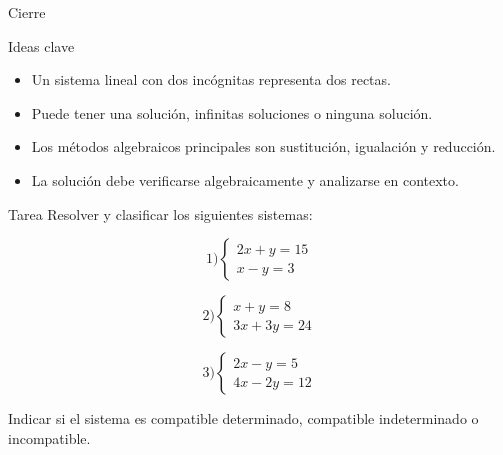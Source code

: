 \documentclass[aspectratio=169]{beamer}
\begin{document}
	\begin{frame}{Cierre}
		\begin{block}{Ideas clave}
			\begin{itemize}
				\item Un sistema lineal con dos incógnitas representa dos rectas.
				\item Puede tener una solución, infinitas soluciones o ninguna solución.
				\item Los métodos algebraicos principales son sustitución, igualación y reducción.
				\item La solución debe verificarse algebraicamente y analizarse en contexto.
			\end{itemize}
		\end{block}
	\end{frame}
	
	\begin{frame}{Tarea}
		Resolver y clasificar los siguientes sistemas:
		
		\[
		1)
		\begin{cases}
			2x+y=15\\
			x-y=3
		\end{cases}
		\]
		
		\[
		2)
		\begin{cases}
			x+y=8\\
			3x+3y=24
		\end{cases}
		\]
		
		\[
		3)
		\begin{cases}
			2x-y=5\\
			4x-2y=12
		\end{cases}
		\]
		
		\bigskip
		
		Indicar si el sistema es compatible determinado, compatible indeterminado o incompatible.
	\end{frame}
	
\end{document}
